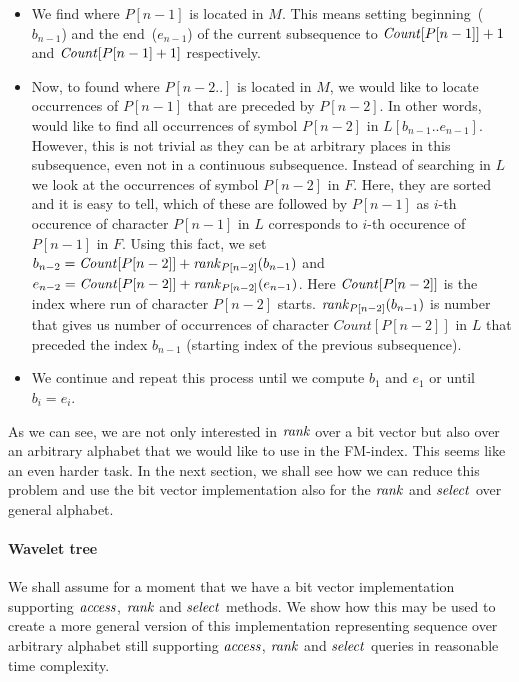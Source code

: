\begin{itemize}
	\item We find where $P[n-1]$ is located in $M$. This means setting beginning~($b_{n-1}$) and
	the end~($e_{n-1}$) of the current subsequence to $\mathit{Count}[P[n-1]]+1$ and $\mathit{Count}[P[n-1]+1]$
	respectively.
	\item Now, to found where $P[n-2..]$ is located in $M$, we would like to locate occurrences
	of $P[n-1]$ that are preceded by $P[n-2]$. In other words, would like to find all
	occurrences of symbol $P[n-2]$ in $L[b_{n-1}..e_{n-1}]$. However, this is not trivial
	as they can be at arbitrary places in this subsequence, even not in a continuous
	subsequence. Instead of searching in $L$ we look at the occurrences of symbol $P[n-2]$ in
	$F$. Here, they are sorted and it is easy to tell, which of these are followed by
	$P[n-1]$ as $i$-th occurence of character $P[n-1]$ in $L$ corresponds to $i$-th
	occurence of $P[n-1]$ in $F$. Using this fact, we set
	$b_{n-2} = \mathit{Count}[P[n-2]] + \mathit{rank}_{P[n-2]}(b_{n-1})$ and
	$e_{n-2} = \mathit{Count}[P[n-2]] + \mathit{rank}_{P[n-2]}(e_{n-1})$. Here $\mathit{Count}[P[n-2]]$
	is the index where run of character $P[n-2]$ starts. $\mathit{rank}_{P[n-2]}(b_{n-1})$
	is number that gives us number of occurrences of character $Count[P[n-2]]$ in $L$ that
	preceded the index $b_{n-1}$ (starting index of the previous subsequence).
	\item We continue and repeat this process until we compute $b_1$ and $e_1$ or until
	$b_i=e_i$.
\end{itemize}

As we can see, we are not only interested in $\mathit{rank}$ over a bit vector but also over an arbitrary
alphabet that we would like to use in the FM-index. This seems like an even harder task.
In the next section, we shall see how we can reduce this problem and use the bit vector
implementation also for the $\mathit{rank}$ and $\mathit{select}$ over general alphabet.

\paragraph{Wavelet tree}
\label{section:WaweletTree}

We shall assume for a moment that we have a bit vector implementation supporting
$\mathit{access}$, $\mathit{rank}$ and $\mathit{select}$ methods. We show how this may be used to create
a more general version of this implementation representing sequence over arbitrary
alphabet still supporting $\mathit{access}$, $\mathit{rank}$ and $\mathit{select}$ queries in reasonable time complexity.


